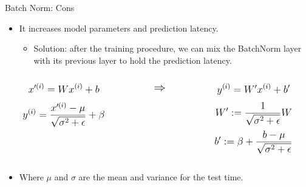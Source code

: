 \begin{frame}{Batch Norm: Cons}
	\begin{itemize}
		\item It increases model parameters and prediction latency.
		\medskip
		\begin{itemize}
			\item Solution: after the training procedure, we can mix the BatchNorm layer with its previous layer to hold the prediction latency.
		\end{itemize}
	\end{itemize}
	\begin{columns}
		\begin{column}[c]{0.45\textwidth}
			\centering
			\begin{equation*}
				\mathlarger{x'^{(i)} = W x^{(i)} + b}
			\end{equation*}
			\begin{equation*}
				\mathlarger{y^{(i)} = \frac{x'^{(i)} - \mu}{\sqrt{\sigma^2 + \epsilon}} + \beta}
			\end{equation*}
		\end{column}
		\begin{column}[c]{0.1\textwidth}
			\centering
			\begin{equation*}
				\mathlarger{\mathlarger{
				\Rightarrow
			}}
			\end{equation*}
		\end{column}
		\begin{column}[c]{0.45\textwidth}
			\centering
			\begin{equation*}
				\mathlarger{y^{(i)} = W' x^{(i)} + b'}
			\end{equation*}
			\begin{equation*}
				\mathlarger{
					W' := \frac{1}{\sqrt{\sigma^2 + \epsilon}} W	
				}
			\end{equation*}
			\begin{equation*}
				\mathlarger{
					b' := \beta + \frac{b- \mu}{\sqrt{\sigma^2 + \epsilon}}	
				}
			\end{equation*}
		\end{column}
	\end{columns}
	\begin{itemize}
		\item Where $\mu$ and $\sigma$ are the mean and variance for the test time.
	\end{itemize}
\end{frame}